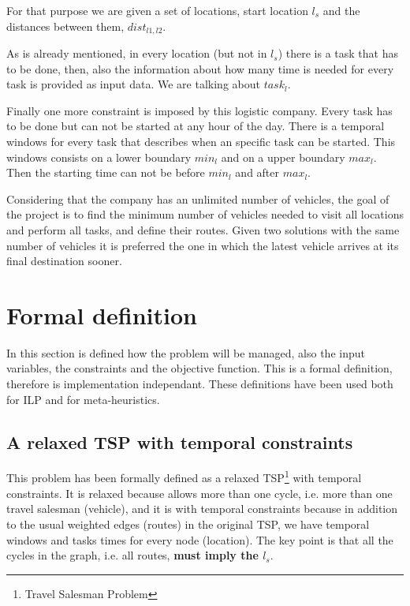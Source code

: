 \documentclass[]{report}
\begin{document}
For that purpose we are given a set of locations, start location $l_{s}$ and the distances between them, $dist_{l1,l2}$.

As is already mentioned, in every location (but not in $l_{s}$) there is a task that has to be done, then, also the information about how many time is needed for every task is provided as input data. We are talking about $task_{l}$.

Finally one more constraint is imposed by this logistic company. Every task has to be done but can not be started at any hour of the day. There is a temporal windows for every task that describes when an specific task can be started. This windows consists on a lower boundary $min_{l}$ and on a upper boundary $max_{l}$. Then the starting time can not be before $min_{l}$ and after $max_{l}$.

Considering that the company has an unlimited number of vehicles, the goal of the project is to find the minimum number of vehicles needed to visit all locations and perform all tasks, and define their routes. Given two solutions with the same number of vehicles it is preferred the one in which the latest vehicle arrives at its final destination sooner.

\section{Formal definition}

In this section is defined how the problem will be managed, also the input variables, the constraints and the objective function. This is a formal definition, therefore is implementation independant. These definitions have been used both for ILP and for meta-heuristics.

\subsection{A relaxed TSP with temporal constraints}\label{ss:relased_tsp}

This problem has been formally defined as a relaxed TSP\footnote{Travel Salesman Problem} with temporal constraints. It is relaxed because allows more than one cycle, i.e. more than one travel salesman (vehicle), and it is with temporal constraints because in addition to the usual weighted edges (routes) in the original TSP, we have temporal windows and tasks times for every node (location). The key point is that all the cycles in the graph, i.e. all routes, \textbf{must imply the $l_{s}$}.
\end{document}
